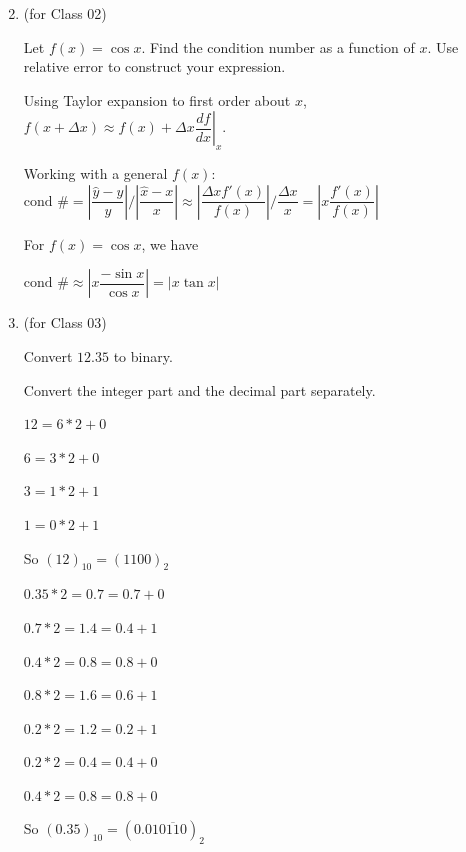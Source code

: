 \documentclass[12pt,letterpaper,answers]{exam}
\begin{document}
 \pdfpageheight 11in 
  \pdfpagewidth 8.5in


\begin{enumerate}
\setcounter{enumi}{1}
\item (for Class 02)

Let $f(x) = 
\cos x$.  Find the condition number as a function of $x$.  Use relative error to construct your expression.

\begin{solution}
Using Taylor expansion to first order about $x$, $f(x+\Delta x)\approx f(x) + \Delta x \left.\dfrac{df}{dx}\right\vert_x$.

Working with a general $f(x)$:
$\text{cond }\# = \left\vert\dfrac{\hat{y}-y}{y} \right\vert / \left\vert\dfrac{\hat{x}-x}{x} \right\vert \approx \left\vert \dfrac{\Delta xf'(x)}{f(x)} \right\vert / \dfrac{\Delta x}{x} = \left\vert x\dfrac{f'(x)}{f(x)}\right\vert$

For $f(x) = \cos x$, we have

$\text{cond }\# \approx \left\vert x \dfrac{-\sin x}{\cos x} \right\vert  = \vert x\tan x\vert$

\end{solution}

\item (for Class 03)

Convert $12.35$ to binary.

\begin{solution}
    Convert the integer part and the decimal part separately.
    \begin{multicols}{2}
    
    $12 = 6*2 + 0$
    
    $6 = 3*2 + 0$
    
    $3 = 1*2 + 1$

    $1 = 0*2 + 1$
    
    So $(12)_{10} = (1100)_2 $
    
    \columnbreak
    
    $0.35 * 2 = 0.7 = 0.7 + 0$
    
    $0.7*2 = 1.4 = 0.4 + 1$
    
    $0.4*2 = 0.8 = 0.8 + 0$
    
    $0.8*2 = 1.6 = 0.6 + 1$
    
    $0.2*2 = 1.2 = 0.2 + 1$
    
    $0.2*2 = 0.4 = 0.4 + 0$
    
    $0.4*2 = 0.8 = 0.8 + 0$
    
    So $(0.35)_{10} = (0.01\overline{0110})_2$
    

\end{multicols}
\end{solution}
\end{enumerate}
\end{document}

